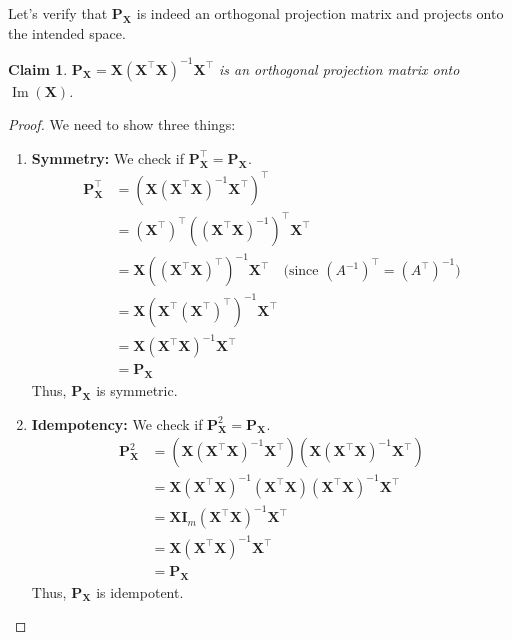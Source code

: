 \documentclass[11pt, a4paper]{article}
\DeclareMathOperator{\Image}{\mathrm{Im}}        %
\newtheorem{claim}[theorem]{Claim} %
\theoremstyle{definition}
\theoremstyle{remark}
\newcommand{\mat}[1]{\mathbf{#1}}       %
\newcommand{\transpose}{^{\top}}        %
\begin{document}
Let's verify that $\mat{P}_{\mat{X}}$ is indeed an orthogonal projection matrix and projects onto the intended space.

\begin{claim}
$\mat{P}_{\mat{X}} = \mat{X} (\mat{X}\transpose \mat{X})^{-1} \mat{X}\transpose$ is an orthogonal projection matrix onto $\Image(\mat{X})$.
\end{claim}

\begin{proof} We need to show three things:
\begin{enumerate}
    \item \textbf{Symmetry:} We check if $\mat{P}_{\mat{X}}\transpose = \mat{P}_{\mat{X}}$.
    \begin{align*} \mat{P}_{\mat{X}}\transpose &= \left( \mat{X} (\mat{X}\transpose \mat{X})^{-1} \mat{X}\transpose \right)\transpose \\ &= (\mat{X}\transpose)\transpose \left( (\mat{X}\transpose \mat{X})^{-1} \right)\transpose \mat{X}\transpose \\ &= \mat{X} \left( (\mat{X}\transpose \mat{X})\transpose \right)^{-1} \mat{X}\transpose \quad \text{(since } (A^{-1})\transpose = (A\transpose)^{-1} \text{)} \\ &= \mat{X} \left( \mat{X}\transpose (\mat{X}\transpose)\transpose \right)^{-1} \mat{X}\transpose \\ &= \mat{X} (\mat{X}\transpose \mat{X})^{-1} \mat{X}\transpose \\ &= \mat{P}_{\mat{X}} \end{align*}
    Thus, $\mat{P}_{\mat{X}}$ is symmetric.

    \item \textbf{Idempotency:} We check if $\mat{P}_{\mat{X}}^2 = \mat{P}_{\mat{X}}$.
    \begin{align*} \mat{P}_{\mat{X}}^2 &= \left( \mat{X} (\mat{X}\transpose \mat{X})^{-1} \mat{X}\transpose \right) \left( \mat{X} (\mat{X}\transpose \mat{X})^{-1} \mat{X}\transpose \right) \\ &= \mat{X} (\mat{X}\transpose \mat{X})^{-1} (\mat{X}\transpose \mat{X}) (\mat{X}\transpose \mat{X})^{-1} \mat{X}\transpose \\ &= \mat{X} \mat{I}_m (\mat{X}\transpose \mat{X})^{-1} \mat{X}\transpose \\ &= \mat{X} (\mat{X}\transpose \mat{X})^{-1} \mat{X}\transpose \\ &= \mat{P}_{\mat{X}} \end{align*}
    Thus, $\mat{P}_{\mat{X}}$ is idempotent.


\end{enumerate}
\end{proof}
\end{document}
